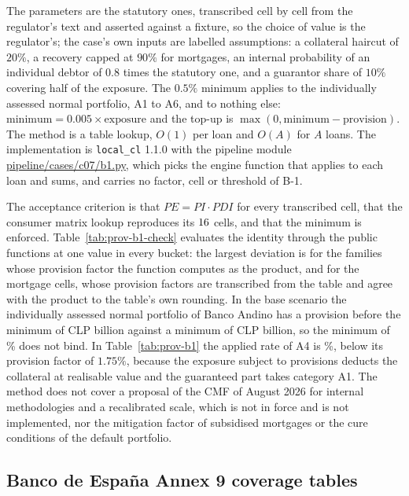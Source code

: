 


The parameters are the statutory ones, transcribed cell by cell from the regulator's text and asserted against a fixture, so the choice of value is the regulator's; the case's own inputs are labelled assumptions: a collateral haircut of $20\%$, a recovery capped at $90\%$ for mortgages, an internal probability of an
individual debtor of $0.8$ times the statutory one, and a guarantor share of $10\%$ covering half of the exposure. The $0.5\%$ minimum applies to the individually assessed normal portfolio, A1 to A6, and to nothing else: $\mathrm{minimum}=0.005\times\mathrm{exposure}$ and the top-up is $\max(0,\mathrm{minimum}-\mathrm{provision})$. The method is a
table lookup, $O(1)$ per loan and $O(A)$ for $A$ loans. The implementation is \texttt{local\_cl} 1.1.0 with the pipeline module \url{pipeline/cases/c07/b1.py}, which picks the engine function that applies to each loan and sums, and carries no factor, cell or threshold of B-1.

The acceptance criterion is that $PE=PI\cdot PDI$ for every transcribed cell, that the consumer matrix lookup reproduces its $16$ cells, and that the minimum is enforced. Table~\ref{tab:prov-b1-check} evaluates the identity through the public functions at one value in every bucket: the largest deviation is
\pvOtherDev{} for the families whose provision factor the function computes as the product, and \pvMortgageDev{} for the \pvMortgageCells{} mortgage cells, whose provision factors are transcribed from the table and agree with the product to the table's own rounding. In the base scenario the individually assessed normal portfolio of Banco Andino has a provision before the minimum of
\pvSevenMinProv{} CLP billion against a minimum of \pvSevenMinAmount{} CLP billion, so the minimum of \pvSevenMin\% does not bind. In Table~\ref{tab:prov-b1} the applied rate of A4 is \pvSevenAFourRate\%, below its provision factor of $1.75\%$, because the exposure subject to provisions deducts the collateral at realisable value and the guaranteed part takes category A1. The method does not cover a proposal of the CMF of August 2026 for internal methodologies and a recalibrated scale, which is not in force and is not implemented, nor the mitigation factor of subsidised mortgages or the cure conditions of the default portfolio.

\subsection{Banco de Espa\~na Annex 9 coverage tables}
\label{sec:m13}

